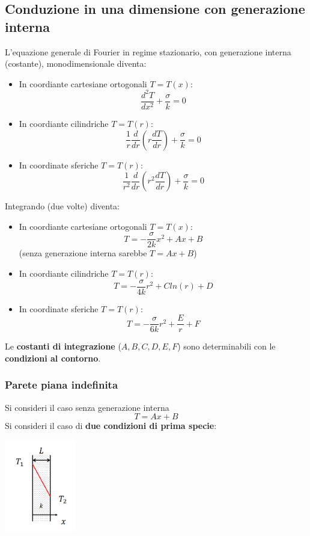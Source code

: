 \subsection{Conduzione in una dimensione con generazione interna}
L’equazione generale di Fourier in regime stazionario, con generazione interna
(costante), monodimensionale diventa:
\begin{itemize}
    \item In coordiante cartesiane ortogonali $T = T(x)$:
    \[
        \frac{d^2T}{dx^2} + \frac{\sigma}{k} = 0
    \]
    \item In coordiante cilindriche $T= T(r)$:
    \[
        \frac{1}{r} \frac{d}{dr}\left(r \frac{dT}{dr}\right) + \frac{\sigma}{k} = 0
    \]
    \item In coordinate sferiche $T =T(r)$:
    \[
        \frac{1}{r^2} \frac{d}{dr}\left(r^2 \frac{dT}{dr}\right) + \frac{\sigma}{k} = 0
    \]
\end{itemize}
Integrando (due volte) diventa:
\begin{itemize}
    \item In coordiante cartesiane ortogonali $T = T(x)$:
    \[
        T = -\frac{\sigma}{2k} x^2 + Ax + B
    \]
    (senza generazione interna sarebbe $T = Ax + B$)
    \item In coordiante cilindriche $T= T(r)$:
    \[
        T = - \frac{\sigma}{4k}r^2 + C ln(r) + D
    \]
    \item In coordinate sferiche $T =T(r)$:
    \[
        T = - \frac{\sigma}{6k}r^2 + \frac{E}{r} + F
    \]
\end{itemize}
Le \textbf{costanti di integrazione} ($A,B,C,D,E,F$) sono determinabili con le \textbf{condizioni al contorno}.
\subsubsection{Parete piana indefinita}
Si consideri il caso senza generazione interna
\[
    T = Ax + B
\]
Si consideri il caso di \textbf{due condizioni di prima specie}:
\begin{center}
    \includegraphics[height=4cm]{../L10/img1.PNG}
\end{center}

